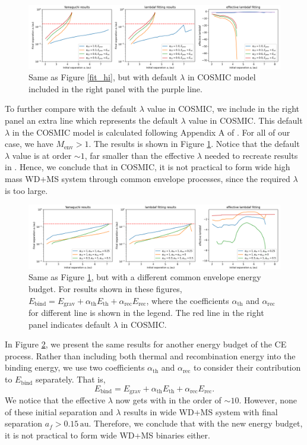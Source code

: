 \documentclass[12pt]{article}
\newcommand{\alphath}{\alpha_{\mathrm{th}}}
\newcommand{\alpharec}{\alpha_{\mathrm{rec}}}
\newcommand{\Ebind}{E_{\mathrm{bind}}}
\newcommand{\Egrav}{E_{\mathrm{grav}}}
\newcommand{\Eth}{E_{\mathrm{th}}}
\newcommand{\Erec}{E_{\mathrm{rec}}}
\newcommand{\au}{\, \mathrm{au}}
\begin{document}
\begin{figure}
  \centering
  \includegraphics[width=\linewidth]{fig/7+1cmp.png}
  \caption{Same as Figure \ref{fit_hi}, but with default $\lambda$ in COSMIC model included in the right panel with the purple line.}
  \label{fit_cmp_hi}
\end{figure}

To further compare with the default $\lambda$ value in COSMIC, we include in the right panel an extra line which represents the default $\lambda$ value in COSMIC. This default $\lambda$ in the COSMIC model is calculated following Appendix A of \cite{claeys2014theoretical}. For all of our case, we have $M_{\mathrm{env}} > 1$. The results is shown in Figure \ref{fit_cmp_hi}. Notice that the default $\lambda$ value is at order $\sim 1$, far smaller than the effective $\lambda$ needed to recreate results in \cite{yamaguchi_hi}. Hence, we conclude that in COSMIC, it is not practical to form wide high mass WD+MS system through common envelope processes, since the required $\lambda$ is too large.

\begin{figure}
  \centering
  \includegraphics[width=\linewidth]{fig/7+1ebcmp.png}
  \caption{Same as Figure \ref{fit_cmp_hi}, but with a different common envelope energy budget. For results shown in these figures, $\Ebind = \Egrav + \alphath \Eth + \alpharec \Erec$, where the coefficients $\alphath$ and $\alpharec$ for different line is shown in the legend. The red line in the right panel indicates default $\lambda$ in COSMIC.}
  \label{fit_cmp_eb_hi}
\end{figure}

In Figure \ref{fit_cmp_eb_hi}, we present the same results for another energy budget of the CE process. Rather than including both thermal and recombination energy into the binding energy, we use two coefficients $\alphath$ and $\alpharec$ to consider their contribution to $\Ebind$ separately. That is,
\[
  \Ebind = \Egrav + \alphath \Eth + \alpharec \Erec.
\]
We notice that the effective $\lambda$ now gets with in the order of $\sim 10$. However, none of these initial separation and $\lambda$ results in wide WD+MS system with final separation $a_f > 0.15 \au$. Therefore, we conclude that with the new energy budget, it is not practical to form wide WD+MS binaries either.
\end{document}
